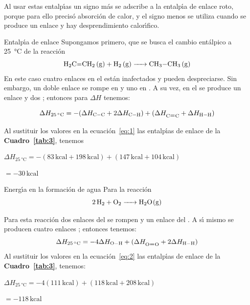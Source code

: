 Al usar estas entalp\'{\i}as un signo m\'as se adscribe a la entalp\'{\i}a de enlace roto, porque para ello precis\'o absorci\'on de calor, y el signo menos se utiliza cuando se produce un enlace y hay desprendimiento calor\'{\i}fico.
\pagebreak 
\begin{ejemplo}{Entalp\'{\i}a de enlace}
Supongamos primero, que se busca el cambio ent\'alpico a \SI{25}{\celsius} de la reacci\'on
\begin{equation}
\ce{H2C=CH2 (g) + H2 (g) -> CH3-CH3 (g)}
\end{equation}
En este caso cuatro enlaces  en el  est\'an inafectados y pueden despreciarse. Sin embargo, un doble enlace se rompe en   y uno  en . A su vez, en el  se produce un enlace   y dos ; entonces para $\Delta H$ tenemos:

\begin{equation}
\label{eq:1}
\Delta H_{ \SI{25}{\celsius} } = - (\Delta H_{\ce{C-C}} + 2 \Delta H_{\ce{C-H}}) + (\Delta H_{\ce{C=C}} + \Delta H_{\ce{H-H}})
\end{equation}

Al sustituir los valores en la ecuaci\'on~\ref{eq:1} las entalp\'{\i}as de enlace de la \textbf{Cuadro~\ref{tab:3}}, tenemos

\hskip 1in   $\Delta H_{ \SI{25}{\celsius} } = -(83 \,\textrm{kcal} + 198 \,\textrm{kcal}) + (147 \,\textrm{kcal} + 104 \,\textrm{kcal})$

\hskip 1.59in $= -30 \,\textrm{kcal}$
\end{ejemplo}
\begin{ejemplo}{Energ\'{\i}a en la formaci\'on de agua}
 Para la reacci\'on
\begin{equation}
\ce{2H2   +  O2 ->  H2O(g)}
\end{equation}

Para esta reacci\'on dos enlaces  del  se rompen y un enlace  del . A s\'{\i} mismo se producen cuatro enlaces ; entonces tenemos:
\begin{equation}
\label{eq:2}
\Delta H_{ \SI{25}{\celsius} } = - 4\Delta H_{\ce{O-H}} 
+ (\Delta H_{\ce{O=O}} + 2\Delta H_{\ce{H-H}})
\end{equation}
Al sustituir los valores en la ecuaci\'on~\ref{eq:2} las
entalp\'{\i}as de enlace de la \textbf{Cuadro~\ref{tab:3}}, tenemos:

\hskip 1in   $\Delta H_{ \SI{25}{\celsius} } = -4(111 \,\textrm{kcal}) + (118 \,\textrm{kcal} + 208 \,\textrm{kcal})$

\hskip 1.59in $= -118  \,\textrm{kcal}$
\end{ejemplo}
